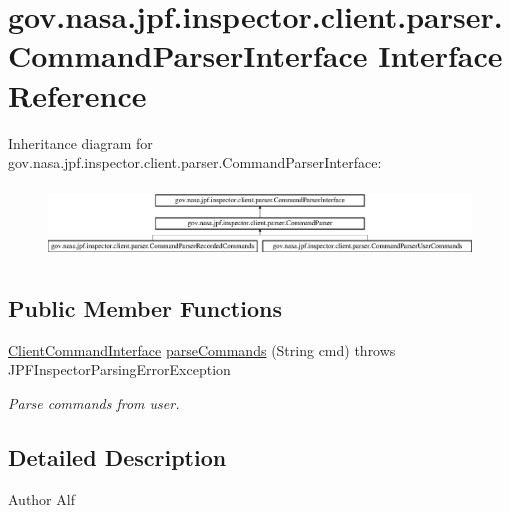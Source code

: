 \hypertarget{interfacegov_1_1nasa_1_1jpf_1_1inspector_1_1client_1_1parser_1_1_command_parser_interface}{}\section{gov.\+nasa.\+jpf.\+inspector.\+client.\+parser.\+Command\+Parser\+Interface Interface Reference}
\label{interfacegov_1_1nasa_1_1jpf_1_1inspector_1_1client_1_1parser_1_1_command_parser_interface}
Inheritance diagram for gov.\+nasa.\+jpf.\+inspector.\+client.\+parser.\+Command\+Parser\+Interface\+:\begin{figure}[H]
\begin{center}
\leavevmode
\includegraphics[height=1.935484cm]{interfacegov_1_1nasa_1_1jpf_1_1inspector_1_1client_1_1parser_1_1_command_parser_interface}
\end{center}
\end{figure}
\subsection*{Public Member Functions}
\begin{DoxyCompactItemize}
\item 
\hyperlink{interfacegov_1_1nasa_1_1jpf_1_1inspector_1_1client_1_1_client_command_interface}{Client\+Command\+Interface} \hyperlink{interfacegov_1_1nasa_1_1jpf_1_1inspector_1_1client_1_1parser_1_1_command_parser_interface_a14ea3eaa90add073b3248a9792a26ca9}{parse\+Commands} (String cmd)  throws J\+P\+F\+Inspector\+Parsing\+Error\+Exception
\begin{DoxyCompactList}\small\item\em Parse commands from user. \end{DoxyCompactList}\end{DoxyCompactItemize}


\subsection{Detailed Description}
\begin{DoxyAuthor}{Author}
Alf 
\end{DoxyAuthor}


